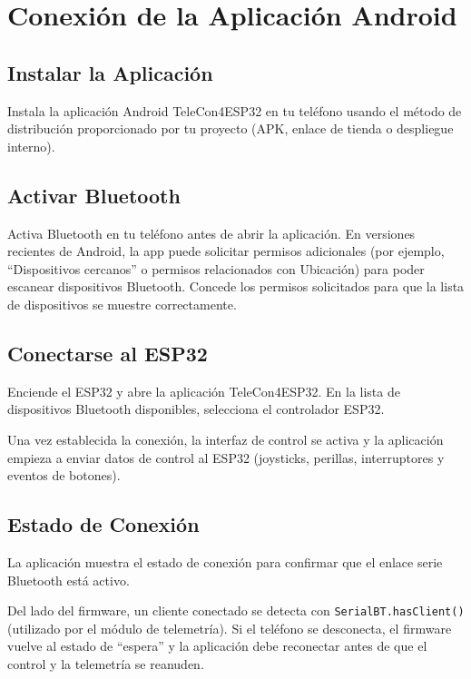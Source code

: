 \chapter{Conexión de la Aplicación Android}


\section{Instalar la Aplicación}
Instala la aplicación Android TeleCon4ESP32 en tu teléfono usando el método de distribución proporcionado
por tu proyecto (APK, enlace de tienda o despliegue interno).

\section{Activar Bluetooth}
Activa Bluetooth en tu teléfono antes de abrir la aplicación. En versiones recientes de Android, la app puede solicitar
permisos adicionales (por ejemplo, ``Dispositivos cercanos'' o permisos relacionados con Ubicación) para poder escanear
dispositivos Bluetooth. Concede los permisos solicitados para que la lista de dispositivos se muestre correctamente.

\section{Conectarse al ESP32}
Enciende el ESP32 y abre la aplicación TeleCon4ESP32. En la lista de dispositivos Bluetooth disponibles, selecciona
el controlador ESP32.

Una vez establecida la conexión, la interfaz de control se activa y la aplicación empieza a enviar datos de control
al ESP32 (joysticks, perillas, interruptores y eventos de botones).

\section{Estado de Conexión}
La aplicación muestra el estado de conexión para confirmar que el enlace serie Bluetooth está activo.

Del lado del firmware, un cliente conectado se detecta con \verb|SerialBT.hasClient()| (utilizado por el módulo
de telemetría). Si el teléfono se desconecta, el firmware vuelve al estado de ``espera'' y la aplicación debe reconectar
antes de que el control y la telemetría se reanuden.

